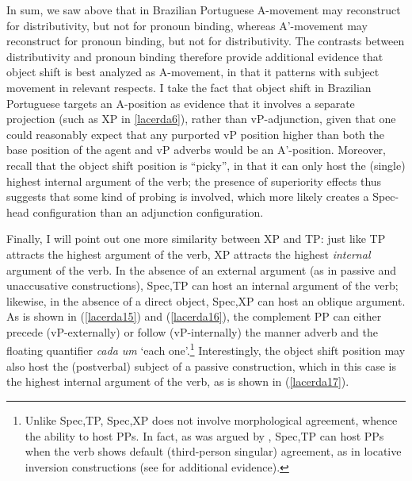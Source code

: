 \documentclass[output=paper]{langscibook}
\begin{document}
In sum, we saw above that in Brazilian Portuguese A-movement may reconstruct for distributivity, but not for pronoun binding, whereas A’-movement may reconstruct for pronoun binding, but not for distributivity. The contrasts between distributivity and pronoun binding therefore provide additional evidence that object shift is best analyzed as A-movement, in that it patterns with subject movement in relevant respects. I take the fact that object shift in Brazilian Portuguese targets an A-position as evidence that it involves a separate projection (such as XP in \ref{lacerda6}), rather than vP-adjunction, given that one could reasonably expect that any purported vP position higher than both the base position of the agent and vP adverbs would be an A’-position. Moreover, recall that the object shift position is “picky”, in that it can only host the (single) highest internal argument of the verb; the presence of superiority effects thus suggests that some kind of probing is involved, which more likely creates a Spec-head configuration than an adjunction configuration.

Finally, I will point out one more similarity between XP and TP: just like TP attracts the highest argument of the verb, XP attracts the highest \emph{internal} argument of the verb. In the absence of an external argument (as in passive and unaccusative constructions), Spec,TP can host an internal argument of the verb; likewise, in the absence of a direct object, Spec,XP can host an oblique argument. As is shown in (\ref{lacerda15}) and (\ref{lacerda16}), the complement PP can either precede (vP-externally) or follow (vP-internally) the manner adverb and the floating quantifier \emph{cada um} ‘each one’.\footnote{Unlike Spec,TP, Spec,XP does not involve morphological agreement, whence the ability to host PPs. In fact, as was argued by \citet{Avelar2009}, Spec,TP can host PPs when the verb shows default (third-person singular) agreement, as in locative inversion constructions (see \citealt{Lacerda2016a,Lacerda2020b} for additional evidence).} Interestingly, the object shift position may also host the (postverbal) subject of a passive construction, which in this case is the highest internal argument of the verb, as is shown in (\ref{lacerda17}).
\end{document}
